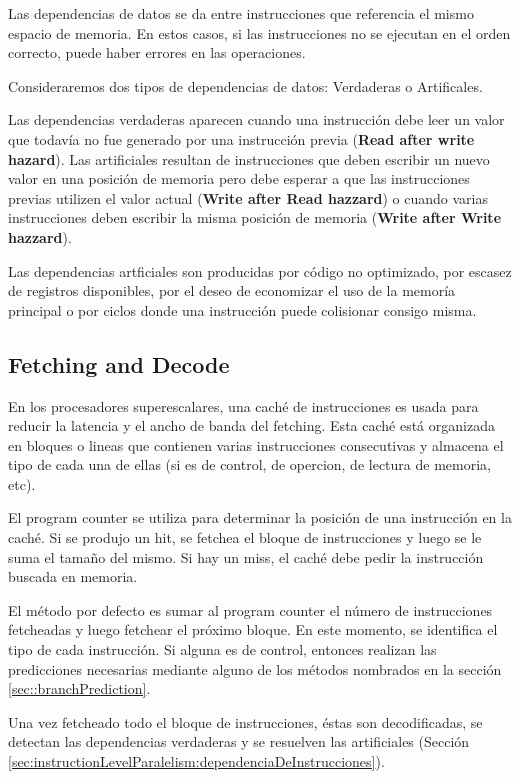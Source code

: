 Las dependencias de datos se da entre instrucciones que referencia el mismo espacio de memoria. En estos casos, si las instrucciones no se ejecutan en el orden correcto, puede haber errores en las operaciones. 

Consideraremos dos tipos de dependencias de datos: Verdaderas o Artificales.

Las dependencias verdaderas aparecen cuando una instrucción debe leer un valor que todavía no fue generado por una instrucción previa (\textbf{Read after write hazard}). Las artificiales resultan de instrucciones que deben escribir un nuevo valor en una posición de memoria pero debe esperar a que las instrucciones previas utilizen el valor actual (\textbf{Write after Read hazzard}) o cuando varias instrucciones deben escribir la misma posición de memoria (\textbf{Write after Write hazzard}).

Las dependencias artficiales son producidas por código no optimizado, por escasez de registros disponibles, por el deseo de economizar el uso de la memoría principal o por ciclos donde una instrucción puede colisionar consigo misma.

\subsection{Fetching and Decode}
En los procesadores superescalares, una caché de instrucciones es usada para reducir la latencia y el ancho de banda del fetching. Esta caché está organizada en bloques o lineas que contienen varias instrucciones consecutivas y almacena el tipo de cada una de ellas (si es de control, de opercion, de lectura de memoria, etc). 

El program counter se utiliza para determinar la posición de una instrucción en la caché. Si se produjo un hit, se fetchea el bloque de instrucciones y luego se le suma el tamaño del mismo. Si hay un miss, el caché debe pedir la instrucción buscada en memoria.

El método por defecto es sumar al program counter el número de instrucciones fetcheadas y luego fetchear el próximo bloque. En este momento, se identifica el tipo de cada instrucción. Si alguna es de control, entonces realizan las predicciones necesarias mediante alguno de los métodos nombrados en la sección \ref{sec::branchPrediction}.

Una vez fetcheado todo el bloque de instrucciones, éstas son decodificadas, se detectan las dependencias verdaderas y se resuelven las artificiales (Sección \ref{sec:instructionLevelParalelism:dependenciaDeInstrucciones}).  

